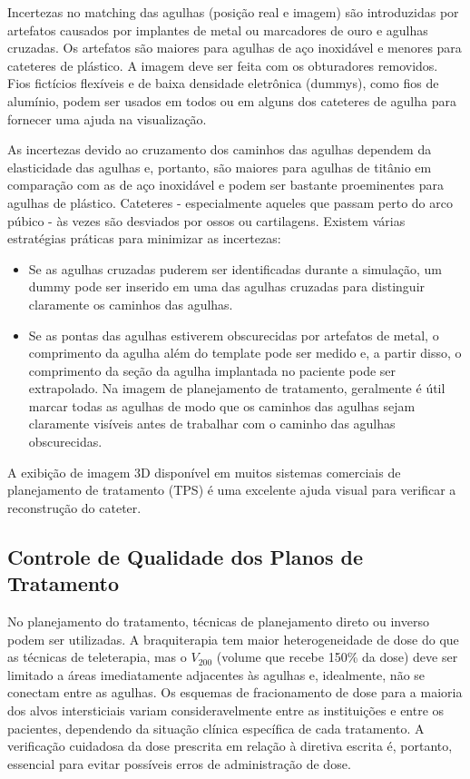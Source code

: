 \documentclass[11pt,a4paper]{article}
\begin{document}
	Incertezas no matching das agulhas (posição real e imagem) são introduzidas por artefatos causados por implantes de metal ou marcadores de ouro e agulhas cruzadas. Os artefatos são maiores para agulhas de aço inoxidável e menores para cateteres de plástico. A imagem deve ser feita com os obturadores removidos. Fios fictícios flexíveis e de baixa densidade eletrônica (dummys), como fios de alumínio, podem ser usados em todos ou em alguns dos cateteres de agulha para fornecer uma ajuda na visualização.

	As incertezas devido ao cruzamento dos caminhos das agulhas dependem da elasticidade das agulhas e, portanto, são maiores para agulhas de titânio em comparação com as de aço inoxidável e podem ser bastante proeminentes para agulhas de plástico. Cateteres - especialmente aqueles que passam perto do arco púbico - às vezes são desviados por ossos ou cartilagens. Existem várias estratégias práticas para minimizar as incertezas:
	
	\begin{itemize}[label=\textcolor{CarnationPink}{$\blacktriangleright$}]
		\item Se as agulhas cruzadas puderem ser identificadas durante a simulação, um dummy pode ser inserido em uma das agulhas cruzadas para distinguir claramente os caminhos das agulhas.
		\item Se as pontas das agulhas estiverem obscurecidas por artefatos de metal, o comprimento da agulha além do template pode ser medido e, a partir disso, o comprimento da seção da agulha implantada no paciente pode ser extrapolado. Na imagem de planejamento de tratamento, geralmente é útil marcar todas as agulhas de modo que os caminhos das agulhas sejam claramente visíveis antes de trabalhar com o caminho das agulhas obscurecidas.
	\end{itemize}
	
	  A exibição de imagem 3D disponível em muitos sistemas comerciais de planejamento de tratamento (TPS) é uma excelente ajuda visual para verificar a reconstrução do cateter.

\subsection*{Controle de Qualidade dos Planos de Tratamento}

	No planejamento do tratamento, técnicas de planejamento direto ou inverso podem ser utilizadas. A braquiterapia tem maior heterogeneidade de dose do que as técnicas de teleterapia, mas o $V_{200}$ (volume que recebe 150\% da dose) deve ser limitado a áreas imediatamente adjacentes às agulhas e, idealmente, não se conectam entre as agulhas. Os esquemas de fracionamento de dose para a maioria dos alvos intersticiais variam consideravelmente entre as instituições e entre os pacientes, dependendo da situação clínica específica de cada tratamento. A verificação cuidadosa da dose prescrita em relação à diretiva escrita é, portanto, essencial para evitar possíveis erros de administração de dose.
\end{document}
